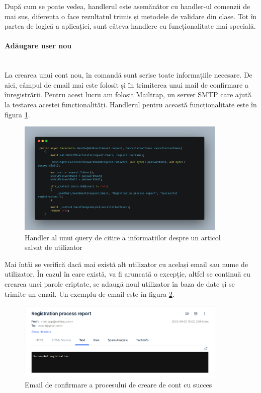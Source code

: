 După cum se poate vedea, handlerul este asemănător cu handler-ul comenzii de mai sus, diferența o face rezultatul trimis și metodele de validare din clase.
Tot în partea de logică a aplicației, sunt câteva handlere cu funcționalitate mai specială. 
\paragraph{Adăugare user nou}
\ \\
La crearea unui cont nou, în comandă sunt scrise toate informațiile necesare. De aici, câmpul de email mai este folosit și în trimiterea unui mail de confirmare a înregistrării. 
Pentru acest lucru am folosit Mailtrap, un server SMTP care ajută la testarea acestei funcționalități. 
Handlerul pentru această funcționalitate este în figura \ref{fig:sendRegistrationMail}.
\begin{figure}[H]
	\centering
	\includegraphics[width=100mm]{figs/sendRegistrationMail.png}
	\caption{Handler al unui query de citire a informațiilor despre un articol salvat de utilizator}
	\label{fig:sendRegistrationMail}
\end{figure}
Mai întâi se verifică dacă mai există alt utilizator cu același email sau nume de utilizator. În cazul în care există, va fi aruncată o excepție, altfel se continuă cu crearea unei parole criptate, se adaugă noul utilizator în baza de date și se trimite un email. 
Un exemplu de email este în figura \ref{fig:registrationReport}.
\begin{figure}[H]
	\centering
	\includegraphics[width=100mm]{figs/registrationReport.png}
	\caption{Email de confirmare a procesului de creare de cont cu succes}
	\label{fig:registrationReport}
\end{figure}


